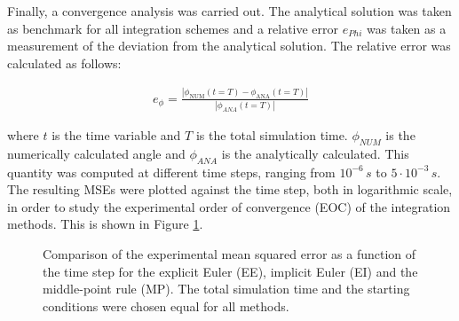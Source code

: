 \documentclass[12pt,bibstyle=none,pagenumberinfooter]{ifmdocument}
\begin{document}
Finally, a convergence analysis was carried out. The analytical solution was taken as benchmark for all integration schemes and a relative error $e_{Phi}$ was taken as a measurement of the deviation from the analytical solution. The relative error was calculated as follows:

\begin{align}
    e_\phi = \frac{| \phi_\mathrm{NUM}(t=T) - \phi_\mathrm{ANA}(t=T)| }{| \phi_{ANA}(t=T)|}
\end{align}

where $t$ is the time variable and $T$ is the total simulation time. $\phi_{NUM}$ is the numerically calculated angle and $\phi_{ANA}$ is the analytically calculated. This quantity was computed at different time steps, ranging from $10^{-6} \, s$ to $5\cdot 10^{-3} \,s$. The resulting MSEs were plotted against the time step, both in logarithmic scale, in order to study the experimental order of convergence (EOC) of the integration methods. This is shown in Figure \ref{fig: ConvergencePlot}.


\begin{figure}[h]
    \centering
    \setlength{\figH}{0.3\textheight}
    \setlength{\figW}{0.6\textwidth}
    
    \caption{Comparison  of the experimental mean squared error as a function of the time step for the explicit Euler (EE), implicit Euler (EI) and the middle-point rule (MP). The total simulation time and the starting conditions were chosen equal for all methods.}
    \label{fig: ConvergencePlot}
\end{figure}
\end{document}
